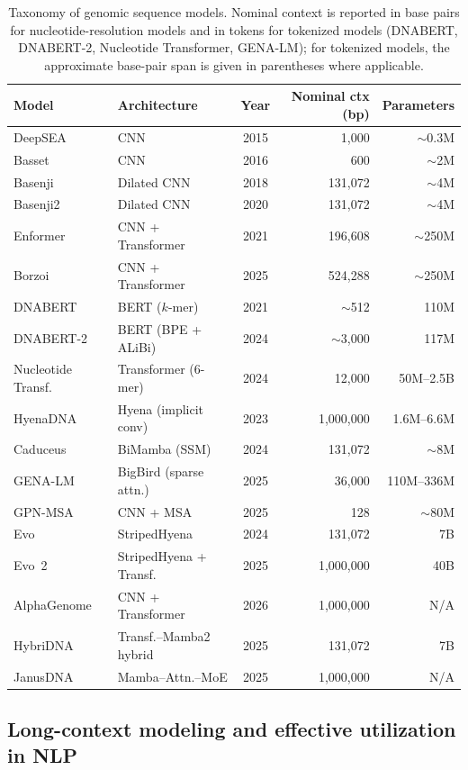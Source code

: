 \begin{table}[t]
\centering
\caption{Taxonomy of genomic sequence models. Nominal context is reported in base pairs for nucleotide-resolution models and in tokens for tokenized models (DNABERT, DNABERT-2, Nucleotide Transformer, GENA-LM); for tokenized models, the approximate base-pair span is given in parentheses where applicable.}
\label{tab:model_taxonomy}
\small
\begin{tabular}{@{}llcrr@{}}
\toprule
\textbf{Model} & \textbf{Architecture} & \textbf{Year} & \textbf{Nominal ctx (bp)} & \textbf{Parameters} \\
\midrule
DeepSEA & CNN & 2015 & 1,000 & $\sim$0.3M \\
Basset & CNN & 2016 & 600 & $\sim$2M \\
Basenji & Dilated CNN & 2018 & 131,072 & $\sim$4M \\
Basenji2 & Dilated CNN & 2020 & 131,072 & $\sim$4M \\
Enformer & CNN + Transformer & 2021 & 196,608 & $\sim$250M \\
Borzoi & CNN + Transformer & 2025 & 524,288 & $\sim$250M \\
DNABERT & BERT ($k$-mer) & 2021 & $\sim$512 & 110M \\
DNABERT-2 & BERT (BPE + ALiBi) & 2024 & $\sim$3,000 & 117M \\
Nucleotide Transf. & Transformer (6-mer) & 2024 & 12,000 & 50M--2.5B \\
HyenaDNA & Hyena (implicit conv) & 2023 & 1,000,000 & 1.6M--6.6M \\
Caduceus & BiMamba (SSM) & 2024 & 131,072 & $\sim$8M \\
GENA-LM & BigBird (sparse attn.) & 2025 & 36,000 & 110M--336M \\
GPN-MSA & CNN + MSA & 2025 & 128 & $\sim$80M \\
Evo & StripedHyena & 2024 & 131,072 & 7B \\
Evo~2 & StripedHyena + Transf. & 2025 & 1,000,000 & 40B \\
AlphaGenome & CNN + Transformer & 2026 & 1,000,000 & N/A \\
HybriDNA & Transf.--Mamba2 hybrid & 2025 & 131,072 & 7B \\
JanusDNA & Mamba--Attn.--MoE & 2025 & 1,000,000 & N/A \\
\bottomrule
\end{tabular}
\end{table}

\subsection{Long-context modeling and effective utilization in NLP}\label{sec:related_nlp}

